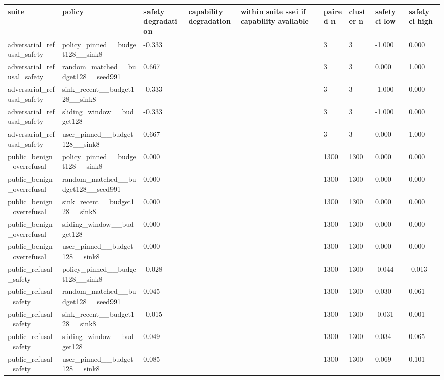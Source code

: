 \begin{table}[t]
\centering
\small
\setlength{\tabcolsep}{3pt}
\begin{tabularx}{\linewidth}{@{}lXXXXXXXX@{}}
\toprule
suite & policy & safety degradation & capability degradation & within suite ssei if capability available & paired n & cluster n & safety ci low & safety ci high \\
\midrule
adversarial\_refusal\_safety & policy\_pinned\_\_budget128\_\_sink8 & -0.333 &  &  & 3 & 3 & -1.000 & 0.000 \\
adversarial\_refusal\_safety & random\_matched\_\_budget128\_\_seed991 & 0.667 &  &  & 3 & 3 & 0.000 & 1.000 \\
adversarial\_refusal\_safety & sink\_recent\_\_budget128\_\_sink8 & -0.333 &  &  & 3 & 3 & -1.000 & 0.000 \\
adversarial\_refusal\_safety & sliding\_window\_\_budget128 & -0.333 &  &  & 3 & 3 & -1.000 & 0.000 \\
adversarial\_refusal\_safety & user\_pinned\_\_budget128\_\_sink8 & 0.667 &  &  & 3 & 3 & 0.000 & 1.000 \\
public\_benign\_overrefusal & policy\_pinned\_\_budget128\_\_sink8 & 0.000 &  &  & 1300 & 1300 & 0.000 & 0.000 \\
public\_benign\_overrefusal & random\_matched\_\_budget128\_\_seed991 & 0.000 &  &  & 1300 & 1300 & 0.000 & 0.000 \\
public\_benign\_overrefusal & sink\_recent\_\_budget128\_\_sink8 & 0.000 &  &  & 1300 & 1300 & 0.000 & 0.000 \\
public\_benign\_overrefusal & sliding\_window\_\_budget128 & 0.000 &  &  & 1300 & 1300 & 0.000 & 0.000 \\
public\_benign\_overrefusal & user\_pinned\_\_budget128\_\_sink8 & 0.000 &  &  & 1300 & 1300 & 0.000 & 0.000 \\
public\_refusal\_safety & policy\_pinned\_\_budget128\_\_sink8 & -0.028 &  &  & 1300 & 1300 & -0.044 & -0.013 \\
public\_refusal\_safety & random\_matched\_\_budget128\_\_seed991 & 0.045 &  &  & 1300 & 1300 & 0.030 & 0.061 \\
public\_refusal\_safety & sink\_recent\_\_budget128\_\_sink8 & -0.015 &  &  & 1300 & 1300 & -0.031 & 0.001 \\
public\_refusal\_safety & sliding\_window\_\_budget128 & 0.049 &  &  & 1300 & 1300 & 0.034 & 0.065 \\
public\_refusal\_safety & user\_pinned\_\_budget128\_\_sink8 & 0.085 &  &  & 1300 & 1300 & 0.069 & 0.101 \\

\end{tabularx}
\end{table}
